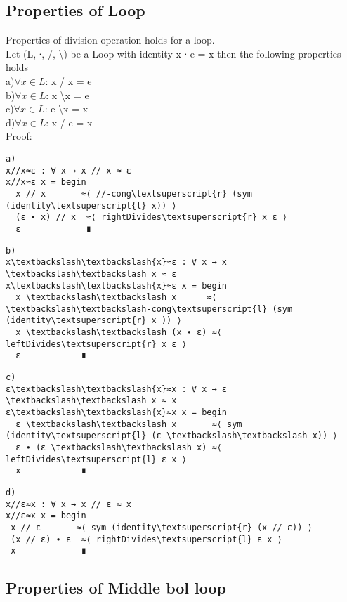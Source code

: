 \subsection{Properties of Loop}
Properties of division operation holds for a loop. \\
Let (L, ∙, /, \textbackslash ) be a Loop with identity x ∙ e = x then the following properties holds \\
a)\(\forall x \in L\): x / x = e \\
b)\(\forall x \in L\):  x \textbackslash x = e\\
c)\(\forall x \in L\): e \textbackslash x = x \\
d)\(\forall x \in L\):  x / e = x \\
Proof:
\begin{center}
\begin{Verbatim}[commandchars=\\\{\},samepage=true]
a)
x//x≈ε : ∀ x → x // x ≈ ε
x//x≈ε x = begin
  x // x       ≈⟨ //-cong\textsuperscript{r} (sym (identity\textsuperscript{l} x)) ⟩
  (ε ∙ x) // x  ≈⟨ rightDivides\textsuperscript{r} x ε ⟩
  ε             ∎
\end{Verbatim}

\begin{Verbatim}[commandchars=\\\{\},samepage=true]
b)
x\textbackslash\textbackslash{x}≈ε : ∀ x → x \textbackslash\textbackslash x ≈ ε
x\textbackslash\textbackslash{x}≈ε x = begin
  x \textbackslash\textbackslash x      ≈⟨ \textbackslash\textbackslash-cong\textsuperscript{l} (sym (identity\textsuperscript{r} x )) ⟩
  x \textbackslash\textbackslash (x ∙ ε) ≈⟨ leftDivides\textsuperscript{r} x ε ⟩
  ε            ∎
\end{Verbatim}
\begin{Verbatim}[commandchars=\\\{\},samepage=true]
c)
ε\textbackslash\textbackslash{x}≈x : ∀ x → ε \textbackslash\textbackslash x ≈ x
ε\textbackslash\textbackslash{x}≈x x = begin
  ε \textbackslash\textbackslash x       ≈⟨ sym (identity\textsuperscript{l} (ε \textbackslash\textbackslash x)) ⟩
  ε ∙ (ε \textbackslash\textbackslash x) ≈⟨ leftDivides\textsuperscript{l} ε x ⟩
  x            ∎
\end{Verbatim}

\begin{Verbatim}[commandchars=\\\{\},samepage=true]
d)
x//ε≈x : ∀ x → x // ε ≈ x
x//ε≈x x = begin
 x // ε       ≈⟨ sym (identity\textsuperscript{r} (x // ε)) ⟩
 (x // ε) ∙ ε  ≈⟨ rightDivides\textsuperscript{l} ε x ⟩
 x             ∎

\end{Verbatim}
\subsection{Properties of Middle bol loop}
\end{center}
